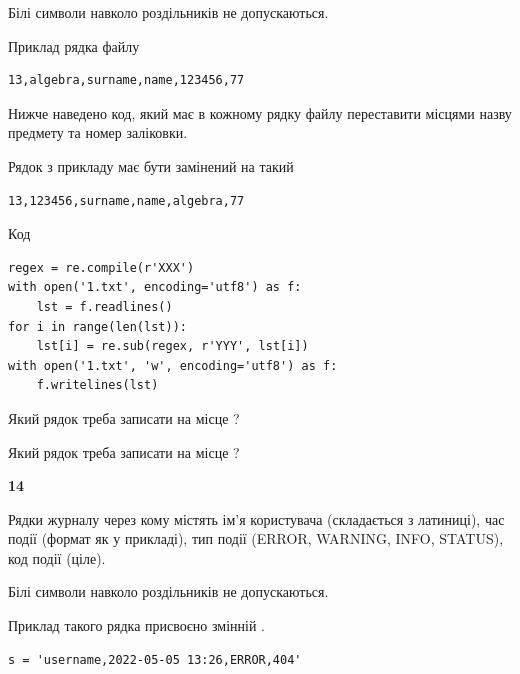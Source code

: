 Білі символи навколо роздільників не допускаються.

Приклад рядка файлу



\begin{verbatim}
13,algebra,surname,name,123456,77
\end{verbatim}


Нижче наведено код, який має в кожному рядку файлу переставити місцями назву предмету та номер заліковки.

Рядок з прикладу має бути замінений на такий



\begin{verbatim}
13,123456,surname,name,algebra,77
\end{verbatim}




Код



\begin{verbatim}
regex = re.compile(r'XXX')
with open('1.txt', encoding='utf8') as f:
    lst = f.readlines()
for i in range(len(lst)):
    lst[i] = re.sub(regex, r'YYY', lst[i])
with open('1.txt', 'w', encoding='utf8') as f:
    f.writelines(lst)
\end{verbatim}







Який рядок треба записати на місце  ?\par
\vspace{5mm}


Який рядок треба записати на місце  ?\par


\newpage

{\begin {center}\textbf{ 14}\end {center}}\par
Рядки журналу через кому містять ім'я користувача (складається з латиниці), час події (фор\-мат як у прикладі), тип події (ERROR, WARNING, INFO, STATUS), код події (ціле).

Білі символи навколо роздільників не допускаються.

Приклад такого рядка присвоєно змінній .



\begin{verbatim}
s = 'username,2022-05-05 13:26,ERROR,404'
\end{verbatim}


